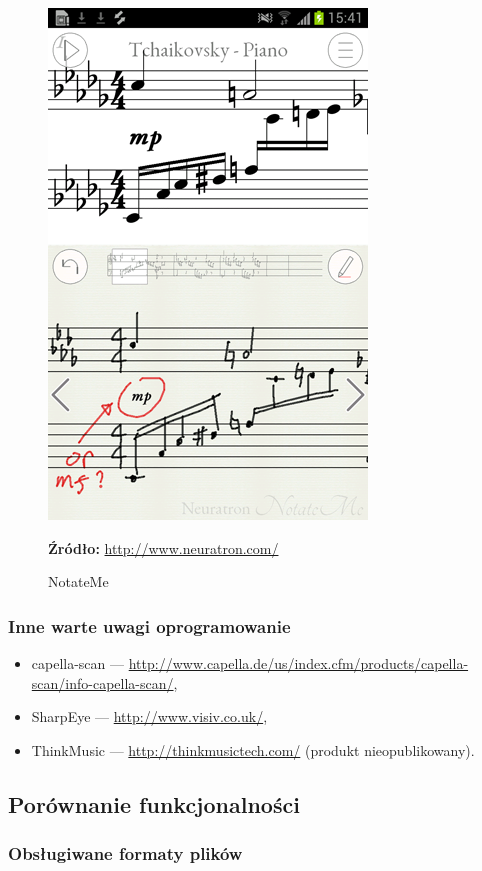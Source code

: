 \documentclass[polish,thesis,12pt]{dcsbook}
\newcommand{\source}[2]{
  	\caption*{\textbf{Źródło:} \href{#1}{{#2}}}
}
\begin{document}
\begin{figure}[H]
  \centering
  \includegraphics[scale=0.5,bb=0 0 320 512]{img/notateme.png}
  \caption{NotateMe}
  \label{notateme}
  \source{http://www.neuratron.com/notateme.html}{http://www.neuratron.com/}
\end{figure}

\subsubsection{Inne warte uwagi oprogramowanie}
\begin{itemize}
  \item capella-scan --- \url{http://www.capella.de/us/index.cfm/products/capella-scan/info-capella-scan/},
  \item SharpEye --- \url{http://www.visiv.co.uk/},
  \item ThinkMusic --- \url{http://thinkmusictech.com/} (produkt nieopublikowany).
\end{itemize}

\subsection{Porównanie funkcjonalności}
\subsubsection{Obsługiwane formaty plików}


\end{document}
